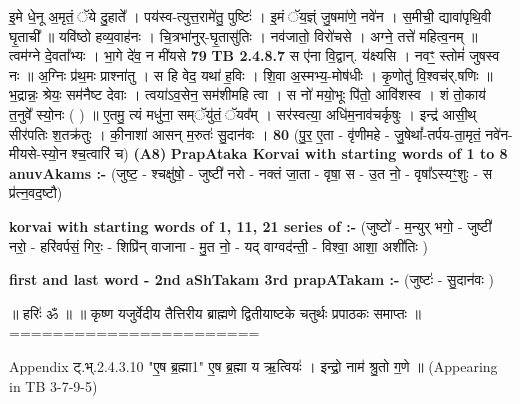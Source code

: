 \documentclass[17pt]{extarticle}
\begin{document}
                  इ॒मे धे॒नू अ॒मृतं॒ ॅये दु॒हाते᳚ । पय॑स्व-त्युत्त॒रामे॑तु॒ पुष्टिः॑ । इ॒मं ॅय॒ज्ञ्ं जु॒षमा॑णे॒ नवे॑न । स॒मीची॒ द्यावा॑पृथि॒वी घृ॒ताची᳚ ॥ यवि॑ष्ठो हव्य॒वाह॑नः । चि॒त्रभा॑नुर्-घृ॒तासु॑तिः । नव॑जातो॒ विरो॑चसे । अग्ने॒ तत्ते॑ महित्व॒नम् ॥ त्वम॑ग्ने दे॒वता᳚भ्यः । भा॒गे दे॑व॒ न मी॑यसे \textbf{ 79} \newline
                  \newline
                                \textbf{ TB 2.4.8.7} \newline
                  स ए॑ना वि॒द्वान्. य॑क्ष्यसि । नवꣳ॒॒ स्तोमं॑ जुषस्व नः ॥ अ॒ग्निः प्र॑थ॒मः प्राश्ना॑तु । स हि वेद॒ यथा॑ ह॒विः । शि॒वा अ॒स्मभ्य॒-मोष॑धीः । कृ॒णोतु॑ वि॒श्वच॑र्.षणिः ॥ भ॒द्रान्नः॒ श्रेयः॒ सम॑नैष्ट देवाः । त्वया॑ऽव॒सेन॒ सम॑शीमहि त्वा । स नो॑ मयो॒भूः पि॑तो॒ आवि॑शस्व । शं तो॒काय॑ त॒नुवे᳚ स्यो॒नः ( ) ॥ ए॒तमु॒ त्यं मधु॑ना॒ सम्ॅयु॑तं॒ ॅयव᳚म् । सर॑स्वत्या॒ अधि॑म॒नाव॑चर्कृषुः । इन्द्र॑ आसी॒थ् सीर॑पतिः श॒तक्र॑तुः । की॒नाशा॑ आसन् म॒रुतः॑ सु॒दान॑वः । \textbf{ 80} \newline
                  \newline
                                    (पु॒र॒ ए॒ता - वृ॑णीमहे - जु॒षेथां᳚-तर्पय-ता॒मृतं॒ नवे॑न-मीयसे-स्यो॒न श्च॒त्वारि॑ च) \textbf{(A8)} \newline \newline
                \textbf{PrapAtaka Korvai with starting  words of 1 to 8 anuvAkams :-} \newline
        (जुष्ट॒ - श्चक्षु॑षो॒ - जुष्टी॑ नरो - नक्तं जा॒ता - वृषा॒ स - उ॒त नो॒ - वृषा᳚ऽस्यꣳ॒॒शुः - स प्र॑त्न॒वद॒ष्टौ) \newline

        \textbf{korvai with starting words of 1, 11, 21 series of :-} \newline
        (जुष्टो॑ - म॒न्युर् भगो॒ - जुष्टी॑ नरो॒ - हरि॑वर्पसं॒ गिरः॒ - शिप्रि॑न् वाजाना - मु॒त नो॒ - यद् वाग्वद॑न्ती॒ - विश्वा॒ आशा॒ अशी॑तिः ) \newline

        \textbf{first and last  word - 2nd aShTakam 3rd prapATakam :-} \newline
        (जुष्टः॑ - सु॒दान॑वः ) \newline 

       

        ॥ हरिः॑ ॐ ॥
॥ कृष्ण यजुर्वेदीय तैत्तिरीय ब्राह्मणे द्वितीयाष्टके चतुर्थः प्रपाठकः समाप्तः ॥
=======================


Appendix
ट्.भ्.2.4.3.10 "ए॒ष ब्र॒ह्मा{1}" 
ए॒ष ब्र॒ह्मा य ऋ॒त्वियः॑ । इन्द्रो॒ नाम॑ श्रु॒तो ग॒णे ॥
(Appearing in TB 3-7-9-5)
\end{document}
